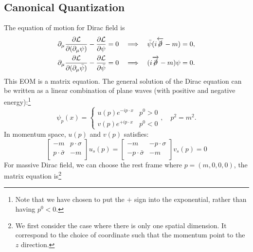 \subsection{Canonical Quantization}
The equation of motion for Dirac field is
\begin{equation}
\begin{aligned}
	\partial_\mu\frac{\partial\mathcal{L}}{\partial(\partial_\mu\psi)} - \frac{\partial \mathcal L}{\partial \psi} = 0 
	\quad &\Longrightarrow \quad
	\bar\psi(i\overleftarrow{\cancel \partial}-m) = 0, \\
	\partial_\mu\frac{\partial\mathcal{L}}{\partial(\partial_\mu\bar\psi)} - \frac{\partial \mathcal L}{\partial \bar\psi} = 0 
	\quad &\Longrightarrow \quad
	(i\overrightarrow{\cancel \partial}-m)\psi = 0.
\end{aligned}
\end{equation}
This EOM is a matrix equation.
The general solution of the Dirac equation can be written as a linear combination of plane waves (with positive and negative energy):\footnote{Note that we have chosen to put the $+$ sign into the exponential, rather than having $p^{0}<0$.}
\begin{equation}
	\psi_p(x) = \begin{cases}
		u(p) e^{-i p \cdot x} & p^{0}>0 \\
		v(p) e^{+i p \cdot x} & p^{0}<0
	\end{cases}, \quad p^{2}=m^{2}.
\end{equation}
In momentum space, $u(p)$ and $v(p)$ satisfies:
\begin{equation}
	\left[\begin{array}{cc}
		-m & p \cdot \sigma \\ p\cdot \bar\sigma & -m
	\end{array} \right] u_s(p) = 
	\left[\begin{array}{cc}
		-m & -p \cdot \sigma \\ -p\cdot \bar\sigma & -m
	\end{array} \right] v_s(p) = 0
\end{equation}
For massive Dirac field, we can choose the rest frame where $p = (m,0,0,0)$, the matrix equation is\footnote{We first consider the case where there is only one spatial dimension. It correspond to the choice of coordinate such that the momentum point to the $z$ direction.}
